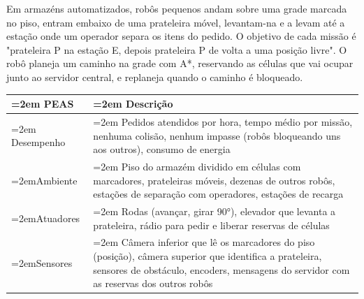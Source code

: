 \documentclass[12pt, a4paper]{article}
\begin{document}
Em armazéns automatizados, robôs pequenos andam sobre uma grade marcada no piso, entram embaixo de uma prateleira móvel, levantam-na e a levam até a estação onde um operador separa os itens do pedido. O objetivo de cada missão é "prateleira P na estação E, depois prateleira P de volta a uma posição livre". O robô planeja um caminho na grade com A*, reservando as células que vai ocupar junto ao servidor central, e replaneja quando o caminho é bloqueado.

\begingroup
\setlength{\tabcolsep}{4.0pt}
\begin{longtable}{@{}>{\raggedright\hyphenpenalty=30\tolerance=999\emergencystretch=2em\arraybackslash}p{3.90cm}>{\raggedright\hyphenpenalty=30\tolerance=999\emergencystretch=2em\arraybackslash}p{11.10cm}@{}}
\toprule\noalign{}
PEAS & Descrição \\
\midrule\noalign{}
\endhead
\bottomrule\noalign{}
\endlastfoot
Desempenho & Pedidos atendidos por hora, tempo médio por missão, nenhuma colisão, nenhum impasse (robôs bloqueando uns aos outros\allowbreak ), consumo de energia \\
Ambiente & Piso do armazém dividido em células com marcadores, prateleiras móveis, dezenas de outros robôs, estações de separação com operadores, estações de recarga \\
Atuadores & Rodas (avançar, girar 90°), elevador que levanta a prateleira, rádio para pedir e liberar reservas de células \\
Sensores & Câmera inferior que lê os marcadores do piso (posição\allowbreak ), câmera superior que identifica a prateleira, sensores de obstáculo, encoders, mensagens do servidor com as reservas dos outros robôs \\
\end{longtable}
\endgroup
\end{document}
